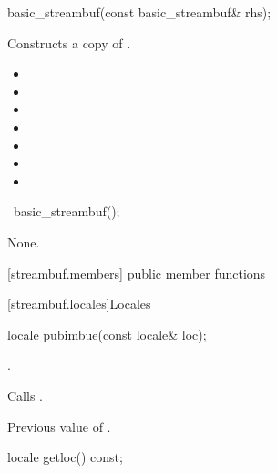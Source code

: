 %
\begin{itemdecl}
basic_streambuf(const basic_streambuf& rhs);
\end{itemdecl}

\begin{itemdescr}
\pnum
\effects Constructs a copy of .

\pnum
\postconditions

\begin{itemize}
\item {}
\item {}
\item {}
\item {}
\item {}
\item {}
\item {}
\end{itemize}
\end{itemdescr}

%
\begin{itemdecl}
~basic_streambuf();
\end{itemdecl}

\begin{itemdescr}
\pnum
\effects
None.
\end{itemdescr}

[streambuf.members]{ public member functions}

[streambuf.locales]{Locales}

%
\begin{itemdecl}
locale pubimbue(const locale& loc);
\end{itemdecl}

\begin{itemdescr}
\pnum
\postcondition
{}.

\pnum
\effects
Calls
.

\pnum
\returns
Previous value of
.
\end{itemdescr}

%
\begin{itemdecl}
locale getloc() const;
\end{itemdecl}

